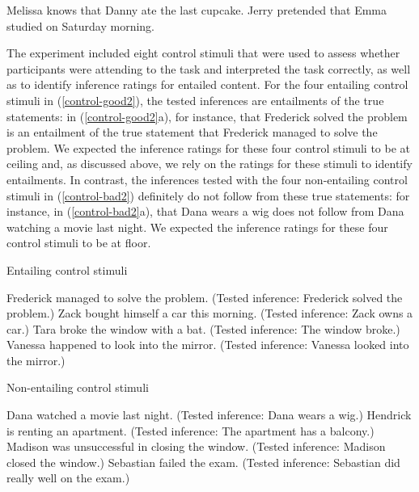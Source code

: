 \documentclass[11pt,fleqn]{article}
\newcommand{\6}{\mbox{$[\hspace*{-.6mm}[$}}
\newcommand{\9}{\mbox{$]\hspace*{-.6mm}]$}}
\begin{document}
\begin{exe}
\ex\label{stims2}
\begin{xlist}
 Melissa knows that Danny ate the last cupcake.
 Jerry pretended that Emma studied on Saturday morning.
\end{xlist}
\end{exe}

The experiment included eight control stimuli that were used to assess whether participants were attending to the task and interpreted the task correctly, as well as to identify inference ratings for entailed content. For the four entailing control stimuli in (\ref{control-good2}), the tested inferences are entailments of the true statements: in (\ref{control-good2}a), for instance, that Frederick solved the problem is an entailment of the true statement that Frederick managed to solve the problem. We expected the inference ratings for these four control stimuli to be at ceiling and, as discussed above, we rely on the ratings for these stimuli to identify entailments. In contrast, the inferences tested with the four non-entailing control stimuli in (\ref{control-bad2}) definitely do not follow from these true statements: for instance, in (\ref{control-bad2}a), that Dana wears a wig does not follow from Dana watching a movie last night. We expected the inference ratings for these four control stimuli to be at floor.

\begin{exe}
\ex\label{control-good2} Entailing control stimuli
\begin{xlist}
 Frederick managed to solve the problem. (Tested inference: Frederick solved the problem.)
 Zack bought himself a car this morning. (Tested inference: Zack owns a car.)
 Tara broke the window with a bat. (Tested inference: The window broke.)
 Vanessa happened to look into the mirror. (Tested inference: Vanessa looked into the mirror.)
\end{xlist}
\ex\label{control-bad2} Non-entailing control stimuli
\begin{xlist}
 Dana watched a movie last night. (Tested inference: Dana wears a wig.)
 Hendrick is renting an apartment. (Tested inference: The apartment has a balcony.)
 Madison was unsuccessful in closing the window. (Tested inference:  Madison closed the window.)
 Sebastian failed the exam. (Tested inference: Sebastian did really well on the exam.)
\end{xlist}
\end{exe}
\end{document}
